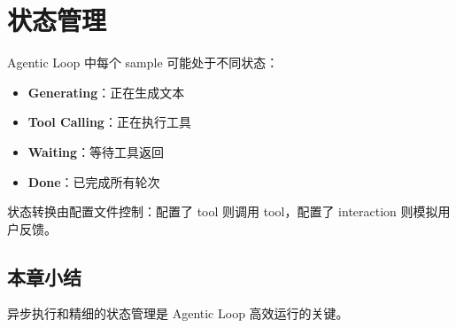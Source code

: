 \section{状态管理}
Agentic Loop 中每个 sample 可能处于不同状态：
\begin{itemize}
  \item \textbf{Generating}：正在生成文本
  \item \textbf{Tool Calling}：正在执行工具
  \item \textbf{Waiting}：等待工具返回
  \item \textbf{Done}：已完成所有轮次
\end{itemize}

状态转换由配置文件控制：配置了 tool 则调用 tool，配置了 interaction 则模拟用户反馈。

\subsection{本章小结}
异步执行和精细的状态管理是 Agentic Loop 高效运行的关键。

\newpage
